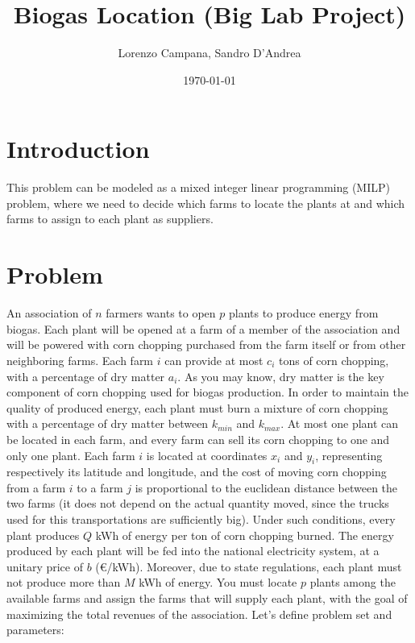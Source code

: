 \documentclass{article}
\begin{document}
\title{Biogas Location (Big Lab Project)}
\author{Lorenzo Campana, Sandro D'Andrea}
\date{\today}
\maketitle

\section{Introduction}
This problem can be modeled as a mixed integer linear programming (MILP) problem, where we need to decide which 
farms to locate the plants at and which farms to assign to each plant as suppliers.

\section{Problem}
An association of $n$ farmers wants to open $p$ plants to produce energy from biogas.
Each plant will be opened at a farm of a member of the association and will be powered with corn chopping purchased from the farm itself or from other neighboring farms.
Each farm $i$ can provide at most $c_i$ tons of corn chopping, with a percentage of dry matter $a_i$. As you may know, dry matter is the key component of corn chopping used for biogas production. In order to maintain the quality of produced energy, each plant must burn a mixture of corn chopping with a percentage of dry matter between $k_{min}$ and $k_{max}$.
At most one plant can be located in each farm, and every farm can sell its corn chopping to one and only one plant.
Each farm $i$ is located at coordinates $x_i$ and $y_i$, representing respectively its latitude and longitude, and the cost of moving corn chopping from a farm $i$ to a farm $j$ is proportional to the euclidean distance between the two farms (it does not depend on the actual quantity moved, since the trucks used for this transportations are sufficiently big).
Under such conditions, every plant produces $Q$ kWh of energy per ton of corn chopping burned. The energy produced by each plant will be fed into the national electricity system, at a unitary price of $b$ (€/kWh). Moreover, due to state regulations, each plant must not produce more than $M$ kWh of energy.
You must locate $p$ plants among the available farms and assign the farms that will supply each plant, with the goal of maximizing the total revenues of the association.
Let's define problem set and parameters:
\end{document}
